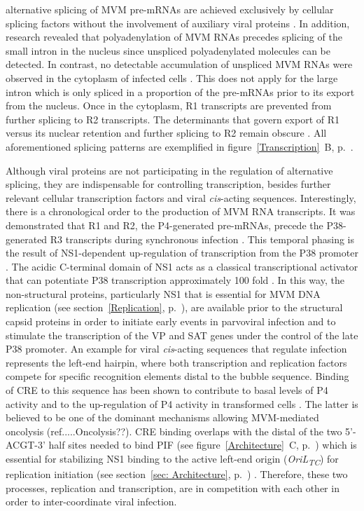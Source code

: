 alternative splicing of MVM pre-mRNAs are achieved exclusively by cellular splicing factors without the involvement of auxiliary viral proteins \cite{pmid1592259}. In addition, research revealed that polyadenylation of MVM RNAs precedes splicing of the small intron in the nucleus since unspliced polyadenylated molecules can be detected. In contrast, no detectable accumulation of unspliced MVM RNAs were observed in the cytoplasm of infected cells \cite{pmid3346950}. This does not apply for the large intron which is only spliced in a proportion of the pre-mRNAs prior to its export from the nucleus. Once in the cytoplasm, R1 transcripts are prevented from further splicing to R2 transcripts. The determinants that govern export of R1 versus its nuclear retention and further splicing to R2 remain obscure \cite{Transcription}. All aforementioned splicing patterns are exemplified in figure~\ref{Transcription}~B, p.~\pageref{Transcription}. 

Although viral proteins are not participating in the regulation of alternative splicing, they are indispensable for controlling transcription, besides further relevant cellular transcription factors and viral \textit{cis}-acting sequences. Interestingly, there is a chronological order to the production of MVM RNA transcripts. It was demonstrated that R1 and R2, the P4-generated pre-mRNAs, precede the P38-generated R3 transcripts during synchronous infection \cite{pmid3346950}. This temporal phasing is the result of NS1-dependent up-regulation of transcription from the P38 promoter \cite{pmid3171551, pmid4020972}. The acidic C-terminal domain of NS1 acts as a classical transcriptional activator that can potentiate P38 transcription approximately 100 fold \cite{pmid1388209}. In this way, the non-structural proteins, particularly NS1 that is essential for MVM DNA replication (see section~\ref{Replication}, p.~\pageref{Replication}), are available prior to the structural capsid proteins in order to initiate early events in parvoviral infection and to stimulate the transcription of the VP and SAT genes under the control of the late P38 promoter. An example for viral \textit{cis}-acting sequences that regulate infection represents the left-end hairpin, where both transcription and replication factors compete for specific recognition elements distal to the bubble sequence. Binding of CRE to this sequence has been shown to contribute to basal levels of P4 activity and to the up-regulation of P4 activity in transformed cells \cite{pmid7636996, pmid8627649}. The latter is believed to be one of the dominant mechanisms allowing MVM-mediated oncolysis (ref.....Oncolysis??). CRE binding overlaps with the distal of the two 5'-ACGT-3' half sites needed to bind PIF (see figure~\ref{Architecture}~C, p.~\pageref{Architecture}) which is essential for stabilizing NS1 binding to the active left-end origin (\textit{OriL\textsubscript{TC}}) for replication initiation (see section~\ref{sec: Architecture}, p.~\pageref{sec: Architecture}) \cite{pmid12050365}. Therefore, these two processes, replication and transcription, are in competition with each other in order to inter-coordinate viral infection.            

